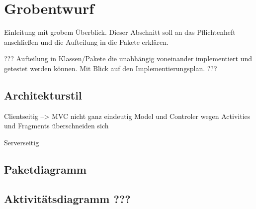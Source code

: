 \section{Grobentwurf}
Einleitung mit grobem Überblick. Dieser Abschnitt soll an das Pflichtenheft anschließen und die Aufteilung in die Pakete erklären.

???
Aufteilung in Klassen/Pakete die unabhängig voneinander implementiert und getestet werden können. Mit Blick auf den Implementierungsplan.
???

\subsection{Architekturstil} 
Clientseitig
--> MVC nicht ganz eindeutig Model und Controler wegen Activities und Fragments überschneiden sich

Serverseitig

\subsection{Paketdiagramm}

\subsection{Aktivitätsdiagramm ???}